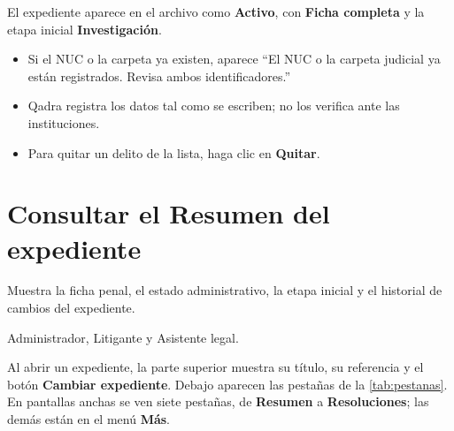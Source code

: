 \resultado El expediente aparece en el archivo como \textbf{Activo}, con
\textbf{Ficha completa} y la etapa inicial \textbf{Investigación}.

\begin{itemize}
  \item Si el NUC o la carpeta ya existen, aparece \enquote{El NUC o la
        carpeta judicial ya están registrados. Revisa ambos
        identificadores.}
  \item Qadra registra los datos tal como se escriben; no los verifica ante
        las instituciones.
  \item Para quitar un delito de la lista, haga clic en \textbf{Quitar}.
\end{itemize}

\section{Consultar el Resumen del expediente}\label{sec:resumen-expediente}

\paraque Muestra la ficha penal, el estado administrativo, la etapa inicial
y el historial de cambios del expediente.

\disponible Administrador, Litigante y Asistente legal.

Al abrir un expediente, la parte superior muestra su título, su referencia y
el botón \textbf{Cambiar expediente}. Debajo aparecen las pestañas de la
\cref{tab:pestanas}. En pantallas anchas se ven siete pestañas, de \textbf{Resumen} a
\textbf{Resoluciones}; las demás están en el menú \textbf{Más}.

